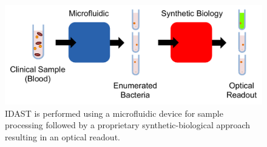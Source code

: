 \begin{figure}[h]
  \begin{minipage}[t]{0.99\linewidth}\centering
    \includegraphics[width=13cm]{idastFlow.pdf}
    \medskip
  \end{minipage}\hfill
  \caption[System-Level View of IDAST]{IDAST is performed using a microfluidic device for sample processing followed by a proprietary synthetic-biological approach resulting in an optical readout.}
    \label{fig:idastFlow}
\end{figure}


